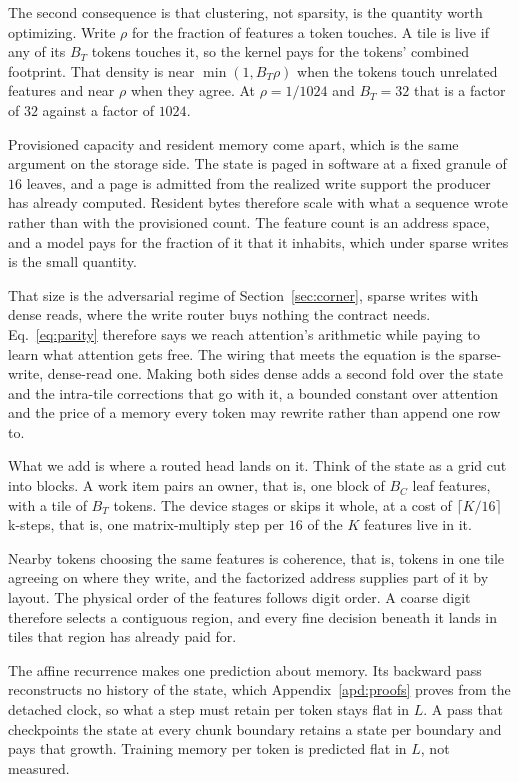 The second consequence is that clustering, not sparsity, is the quantity worth optimizing. Write $\rho$ for the fraction of features a token touches. A tile is live if any of its $B_T$ tokens touches it, so the kernel pays for the tokens' combined footprint. That density is near $\min(1, B_T\rho)$ when the tokens touch unrelated features and near $\rho$ when they agree. At $\rho = 1/1024$ and $B_T = 32$ that is a factor of $32$ against a factor of $1024$.

Provisioned capacity and resident memory come apart, which is the same argument on the storage side. The state is paged in software at a fixed granule of $16$ leaves, and a page is admitted from the realized write support the producer has already computed. Resident bytes therefore scale with what a sequence wrote rather than with the provisioned count. The feature count is an address space, and a model pays for the fraction of it that it inhabits, which under sparse writes is the small quantity.

That size is the adversarial regime of Section~\ref{sec:corner}, sparse writes with dense reads, where the write router buys nothing the contract needs. Eq.~\eqref{eq:parity} therefore says we reach attention's arithmetic while paying to learn what attention gets free. The wiring that meets the equation is the sparse-write, dense-read one. Making both sides dense adds a second fold over the state and the intra-tile corrections that go with it, a bounded constant over attention and the price of a memory every token may rewrite rather than append one row to.

What we add is where a routed head lands on it. Think of the state as a grid cut into blocks. A work item pairs an owner, that is, one block of $B_C$ leaf features, with a tile of $B_T$ tokens. The device stages or skips it whole, at a cost of $\lceil K / 16 \rceil$ k-steps, that is, one matrix-multiply step per $16$ of the $K$ features live in it.

Nearby tokens choosing the same features is coherence, that is, tokens in one tile agreeing on where they write, and the factorized address supplies part of it by layout. The physical order of the features follows digit order. A coarse digit therefore selects a contiguous region, and every fine decision beneath it lands in tiles that region has already paid for.

The affine recurrence makes one prediction about memory. Its backward pass reconstructs no history of the state, which Appendix~\ref{apd:proofs} proves from the detached clock, so what a step must retain per token stays flat in $L$. A pass that checkpoints the state at every chunk boundary retains a state per boundary and pays that growth. Training memory per token is predicted flat in $L$, not measured.


